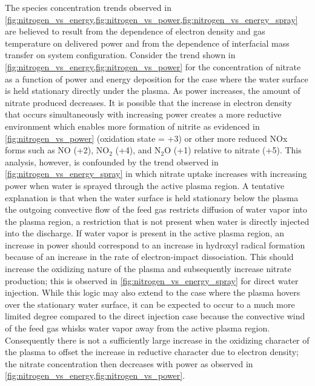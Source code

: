 The species concentration trends observed in \cref{fig:nitrogen_vs_energy,fig:nitrogen_vs_power,fig:nitrogen_vs_energy_spray} are believed to result from the dependence of electron density and gas temperature on delivered power and from the dependence of interfacial mass transfer on system configuration.   Consider the trend shown in \cref{fig:nitrogen_vs_energy,fig:nitrogen_vs_power} for the concentration of nitrate as a function of power and energy deposition for the case where the water surface is held stationary directly under the plasma.  As power increases, the amount of nitrate produced decreases.  It is possible that the increase in electron density that occurs simultaneously with increasing power creates a more reductive environment which enables more formation of  nitrite as evidenced in \cref{fig:nitrogen_vs_power} (oxidation state = +3) or other more reduced NOx forms such as NO (+2), NO$_2$ (+4), and N$_2$O (+1)  relative to nitrate (+5).  This analysis, however, is confounded by the trend observed in \cref{fig:nitrogen_vs_energy_spray} in which nitrate uptake increases with increasing power when water is sprayed through the active plasma region.  A tentative explanation is that when the water surface is held stationary below the plasma the outgoing convective flow of the feed gas restricts diffusion of water vapor into the plasma region, a restriction that is not present when water is directly injected into the discharge.  If water vapor is present in the active plasma region, an increase in power should correspond to an increase in hydroxyl radical formation because of an increase in the rate of electron-impact dissociation.  This should increase the oxidizing nature of the plasma and subsequently increase nitrate production; this is observed in \cref{fig:nitrogen_vs_energy_spray} for direct water injection.  While this logic may also extend to the case where the plasma hovers over the stationary water surface, it can be expected to occur to a much more limited degree compared to the direct injection case because the convective wind of the feed gas whisks water vapor away from the active plasma region.  Consequently there is not a sufficiently large increase in the oxidizing character of the plasma to offset the increase in reductive character due to electron density; the nitrate concentration then decreases with power as observed in \cref{fig:nitrogen_vs_energy,fig:nitrogen_vs_power}.

